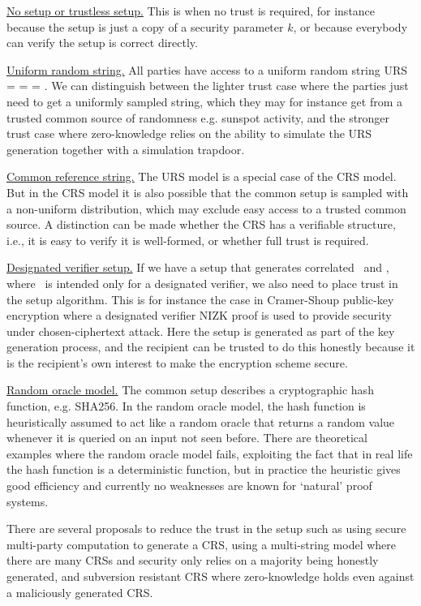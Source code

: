 \begin{bulletize}
	\item \underline{No setup or trustless setup.}
	This is when no trust is required, for instance because the setup is just a copy of a security parameter $k$, or because everybody can verify the setup is correct directly.
    
	\item \underline{Uniform random string.}
	All parties have access to a uniform random string URS = \setR = \setP = \setV. 
	We can distinguish between the lighter trust case where the parties just need to get a uniformly sampled string, which they may for instance get from a trusted common source of randomness e.g. sunspot activity, and the stronger trust case where zero-knowledge relies on the ability to simulate the URS generation together with a simulation trapdoor.

  \item \underline{Common reference string.}
	The URS model is a special case of the CRS model. 
	But in the CRS model it is also possible that the common setup is sampled with a non-uniform distribution, which may exclude easy access to a trusted common source. 
	A distinction can be made whether the CRS has a verifiable structure, i.e., it is easy to verify it is well-formed, or whether full trust is required.
    
	\item \underline{Designated verifier setup.}
	If we have a setup that generates correlated \setP\ and \setV, where \setV\ is intended only for a designated verifier, we also need to place trust in the setup algorithm. 
	This is for instance the case in Cramer-Shoup public-key encryption where a designated verifier NIZK proof is used to provide security under chosen-ciphertext attack. 
	Here the setup is generated as part of the key generation process, and the recipient can be trusted to do this honestly because it is the recipient’s own interest to make the encryption scheme secure.
    
	\item \underline{Random oracle model.}
	The common setup describes a cryptographic hash function, e.g. SHA256. 
	In the random oracle model, the hash function is heuristically assumed to act like a random oracle that returns a random value whenever it is queried on an input not seen before. 
	There are theoretical examples where the random oracle model fails, exploiting the fact that in real life the hash function is a deterministic function, but in practice the heuristic gives good efficiency and currently no weaknesses are known for ‘natural’ proof systems.
    
	\item There are several proposals to reduce the trust in the setup such as using secure multi-party computation to generate a CRS, using a multi-string model where there are many CRSs and security only relies on a majority being honestly generated, and subversion resistant CRS where zero-knowledge holds even against a maliciously generated CRS.
\end{bulletize}



